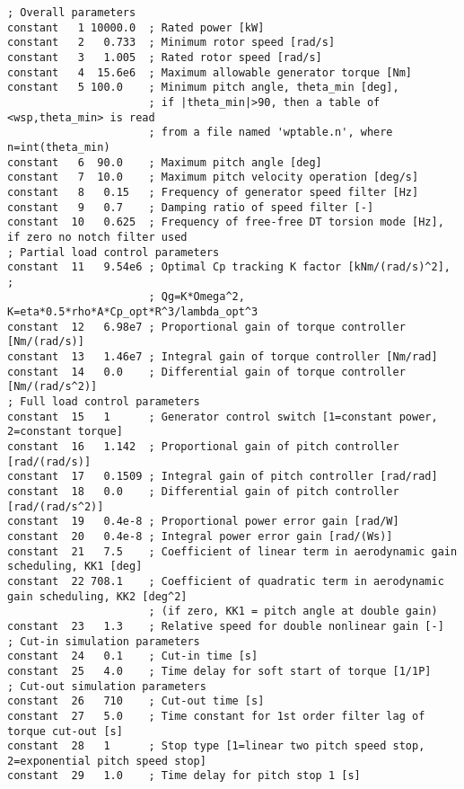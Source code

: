 \begin{table}[b]
\begin{center}
\scriptsize
\begin{verbatim}
; Overall parameters
constant   1 10000.0  ; Rated power [kW]
constant   2   0.733  ; Minimum rotor speed [rad/s]
constant   3   1.005  ; Rated rotor speed [rad/s]
constant   4  15.6e6  ; Maximum allowable generator torque [Nm]
constant   5 100.0    ; Minimum pitch angle, theta_min [deg],
                      ; if |theta_min|>90, then a table of <wsp,theta_min> is read
                      ; from a file named 'wptable.n', where n=int(theta_min)
constant   6  90.0    ; Maximum pitch angle [deg]
constant   7  10.0    ; Maximum pitch velocity operation [deg/s]
constant   8   0.15   ; Frequency of generator speed filter [Hz]
constant   9   0.7    ; Damping ratio of speed filter [-]
constant  10   0.625  ; Frequency of free-free DT torsion mode [Hz], if zero no notch filter used
; Partial load control parameters
constant  11   9.54e6 ; Optimal Cp tracking K factor [kNm/(rad/s)^2], ;
                      ; Qg=K*Omega^2, K=eta*0.5*rho*A*Cp_opt*R^3/lambda_opt^3
constant  12   6.98e7 ; Proportional gain of torque controller [Nm/(rad/s)]
constant  13   1.46e7 ; Integral gain of torque controller [Nm/rad]
constant  14   0.0    ; Differential gain of torque controller [Nm/(rad/s^2)]
; Full load control parameters
constant  15   1      ; Generator control switch [1=constant power, 2=constant torque]
constant  16   1.142  ; Proportional gain of pitch controller [rad/(rad/s)]
constant  17   0.1509 ; Integral gain of pitch controller [rad/rad]
constant  18   0.0    ; Differential gain of pitch controller [rad/(rad/s^2)]
constant  19   0.4e-8 ; Proportional power error gain [rad/W]
constant  20   0.4e-8 ; Integral power error gain [rad/(Ws)]
constant  21   7.5    ; Coefficient of linear term in aerodynamic gain scheduling, KK1 [deg]
constant  22 708.1    ; Coefficient of quadratic term in aerodynamic gain scheduling, KK2 [deg^2]
                      ; (if zero, KK1 = pitch angle at double gain)
constant  23   1.3    ; Relative speed for double nonlinear gain [-]
; Cut-in simulation parameters
constant  24   0.1    ; Cut-in time [s]
constant  25   4.0    ; Time delay for soft start of torque [1/1P]
; Cut-out simulation parameters
constant  26   710    ; Cut-out time [s]
constant  27   5.0    ; Time constant for 1st order filter lag of torque cut-out [s]
constant  28   1      ; Stop type [1=linear two pitch speed stop, 2=exponential pitch speed stop]
constant  29   1.0    ; Time delay for pitch stop 1 [s]

\end{verbatim}
\end{center}
\end{table}
